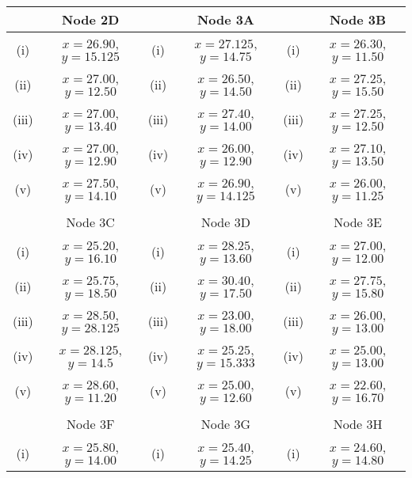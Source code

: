 								\begin{tabular}{||c|c||c|c||c|c||}
								
					
					\hline  & Node 2D &   & Node 3A &  & Node 3B   \\  \hline
					\hline (i) & $x= 26.90$, $y= 15.125$ &  (i) & $x= 27.125$, $y= 14.75$  & (i)  & $x= 26.30$, $y= 11.50$\\  \hline
					\hline (ii)  & $x= 27.00$, $y= 12.50$  &  (ii) & $x= 26.50$, $y= 14.50$ & (ii) & $x= 27.25$, $y = 15.50$ \\  \hline
					\hline (iii) & $x= 27.00$, $y = 13.40$  & (iii) & $x= 27.40$, $y =14.00 $ &(iii) & $x= 27.25$, $y= 12.50$ \\  \hline
					\hline (iv)  & $x= 27.00$, $y= 12.90$  & (iv) & $x= 26.00$, $y = 12.90$ & (iv)  & $x= 27.10$, $y= 13.50$\\  \hline
					\hline (v) & $x= 27.50$, $y= 14.10$ & (v) & $x= 26.90$, $y= 14.125 $  &(v) & $x= 26.00$, $y= 11.25$\\  \hline & & & & & \\
					\hline 
					\hline  & Node 3C &   & Node 3D &  & Node 3E  \\  \hline
					\hline (i) & $x= 25.20$, $y = 16.10$ &  (i) & $x= 28.25$, $y = 13.60$  & (i)  & $x= 27.00$, $y = 12.00$\\  \hline
					\hline (ii) & $x= 25.75$, $y= 18.50$  & (ii) & $x= 30.40$, $y =17.50 $ &(ii) & $x= 27.75$, $y = 15.80$ \\  \hline
					\hline (iii)  & $x= 28.50$, $y= 28.125$  & (iii) & $x= 23.00$, $y = 18.00$ & (iii)  & $x= 26.00$, $y = 13.00$\\  \hline
					\hline (iv)  & $x= 28.125$, $y= 14.5$  &  (iv) & $x= 25.25$, $y = 15.333$ & (iv) & $x= 25.00$, $y = 13.00$ \\  \hline
					\hline (v) & $x= 28.60$, $y= 11.20$ & (v) & $x= 25.00 $, $y = 12.60$  &(v) & $x= 22.60$, $y = 16.70$\\  \hline & & & & & \\
					\hline 
					\hline  &  Node 3F &  & Node 3G &   & Node 3H \\  \hline
					\hline (i) & $x= 25.80$, $y= 14.00$ & (i) & $x= 25.40$, $y = 14.25$  & (i)  & $x= 24.60$, $y= 14.80$\\  \hline

\end{tabular}
